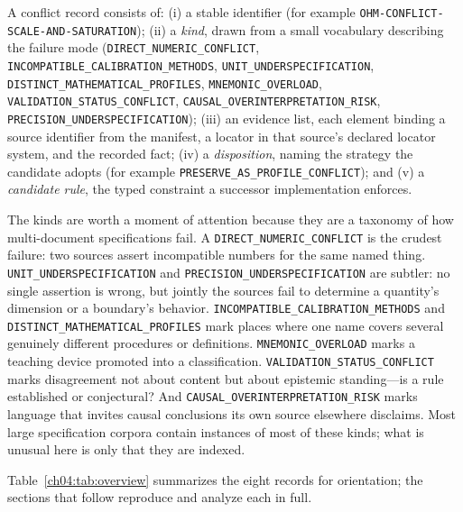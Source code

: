 \begin{definition}\label{ch04:def:record}
A conflict record consists of: (i) a stable identifier (for example
\texttt{OHM-CONFLICT-SCALE-AND-SATURATION}); (ii) a \emph{kind}, drawn from a
small vocabulary describing the failure mode
(\texttt{DIRECT\_NUMERIC\_CONFLICT},
\texttt{INCOMPATIBLE\_CALIBRATION\_METHODS},
\texttt{UNIT\_UNDERSPECIFICATION},
\texttt{DISTINCT\_MATHEMATICAL\_PROFILES}, \texttt{MNEMONIC\_OVERLOAD},
\texttt{VALIDATION\_STATUS\_CONFLICT},
\texttt{CAUSAL\_OVERINTERPRETATION\_RISK},
\texttt{PRECISION\_UNDERSPECIFICATION}); (iii) an evidence list, each element
binding a source identifier from the manifest, a locator in that source's
declared locator system, and the recorded fact; (iv) a \emph{disposition},
naming the strategy the candidate adopts
(for example \texttt{PRESERVE\_AS\_PROFILE\_CONFLICT}); and (v) a
\emph{candidate rule}, the typed constraint a successor implementation
enforces.
\end{definition}

The kinds are worth a moment of attention because they are a taxonomy of how
multi-document specifications fail. A \texttt{DIRECT\_NUMERIC\_CONFLICT} is
the crudest failure: two sources assert incompatible numbers for the same
named thing. \texttt{UNIT\_UNDERSPECIFICATION} and
\texttt{PRECISION\_UNDERSPECIFICATION} are subtler: no single assertion is
wrong, but jointly the sources fail to determine a quantity's dimension or a
boundary's behavior. \texttt{INCOMPATIBLE\_CALIBRATION\_METHODS} and
\texttt{DISTINCT\_MATHEMATICAL\_PROFILES} mark places where one name covers
several genuinely different procedures or definitions.
\texttt{MNEMONIC\_OVERLOAD} marks a teaching device promoted into a
classification. \texttt{VALIDATION\_STATUS\_CONFLICT} marks disagreement not
about content but about epistemic standing---is a rule established or
conjectural? And \texttt{CAUSAL\_OVERINTERPRETATION\_RISK} marks language
that invites causal conclusions its own source elsewhere disclaims. Most
large specification corpora contain instances of most of these kinds; what is
unusual here is only that they are indexed.

Table~\ref{ch04:tab:overview} summarizes the eight records for orientation;
the sections that follow reproduce and analyze each in full.

